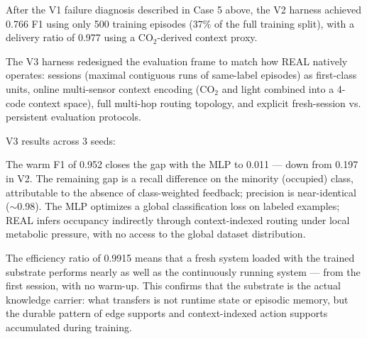 \documentclass[letterpaper]{article}
\begin{document}
After the V1 failure diagnosis described in Case 5 above, the V2 harness achieved 0.766 F1 using only 500 training episodes (37\% of the full training split), with a delivery ratio of 0.977 using a CO$_2$-derived context proxy.

The V3 harness redesigned the evaluation frame to match how REAL natively operates: sessions (maximal contiguous runs of same-label episodes) as first-class units, online multi-sensor context encoding (CO$_2$ and light combined into a 4-code context space), full multi-hop routing topology, and explicit fresh-session vs. persistent evaluation protocols.

V3 results across 3 seeds:

\begin{table}[ht]
    \centering
    \caption{V3 Occupancy results across 3 seeds.}
    \label{tab:occupancy}
\end{table}

The warm F1 of 0.952 closes the gap with the MLP to 0.011 — down from 0.197 in V2. The remaining gap is a recall difference on the minority (occupied) class, attributable to the absence of class-weighted feedback; precision is near-identical ($\sim$0.98). The MLP optimizes a global classification loss on labeled examples; REAL infers occupancy indirectly through context-indexed routing under local metabolic pressure, with no access to the global dataset distribution.

The efficiency ratio of 0.9915 means that a fresh system loaded with the trained substrate performs nearly as well as the continuously running system — from the first session, with no warm-up. This confirms that the substrate is the actual knowledge carrier: what transfers is not runtime state or episodic memory, but the durable pattern of edge supports and context-indexed action supports accumulated during training.
\end{document}
